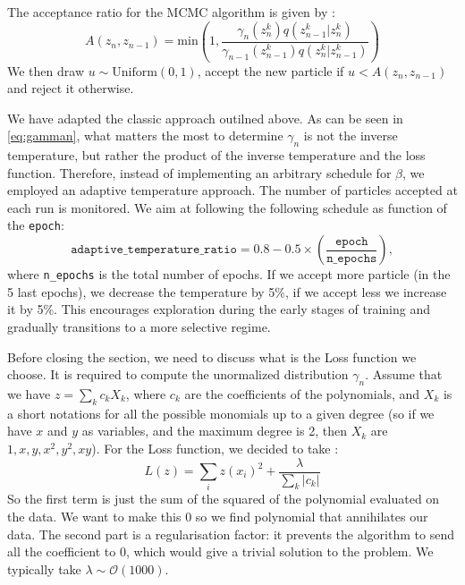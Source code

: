 \documentclass[11pt,a4paper]{article}
\newcommand{\bd}[1]{\marginpar{\parbox{\marginparwidth}{\boldmath $\Longleftarrow$}}{\boldmath\bfseries (bd: #1)}}
\begin{document}
		
		The acceptance ratio for the MCMC algorithm is given by : 
		\begin{equation}\label{eq:acceptanceratio}
			A(z_n,z_{n-1}) = \mathrm{min} \left(1,\frac{ \gamma_n(z_n^k) q(z_{n-1}^k | z_n^k) }{ \gamma_{n-1}(z_{n-1}^k) q(z_n^k | z_{n-1}^k) }  \right)
		\end{equation}
		We then draw $u\sim \mathrm{Uniform}(0,1)$, accept the new particle if $u<A(z_n,z_{n-1})$ and reject it otherwise.

		We have adapted the classic approach outilned above. As can be seen in \eqref{eq:gamman}, what matters the most to determine $\gamma_{n}$ is not the inverse temperature, but rather the product of the inverse temperature and the loss function. Therefore, instead of implementing an arbitrary schedule for $\beta$, we employed an adaptive temperature approach. The number of particles accepted at each run is monitored. We aim at following the following schedule as function of the \texttt{epoch}:
		\begin{equation} \label{eq:eqadaptivetemperatureschedule}
			\texttt{adaptive\_temperature\_ratio} = 0.8 - 0.5 \times \left(\frac{\texttt{epoch}}{\texttt{n\_epochs}}\right),
		\end{equation}
		where \texttt{n\_epochs} is the total number of epochs. If we accept more particle (in the 5 last epochs), we decrease the temperature by 5\%, if we accept less we increase it by 5\%. This encourages exploration during the early stages of training and gradually transitions to a more selective regime. \bd{Move \ref{eq:eqadaptivetemperatureschedule} in seciton 4?}
		
		Before closing the section, we need to discuss what is the Loss function we choose. It is required to compute the unormalized distribution $\gamma_n$. Assume that we have $z = \sum_k c_k X_k$, where $c_k$ are the coefficients of the polynomials, and $X_k$ is a short notations for all the possible monomials up to a given degree (so if we have $x$ and $y$ as variables, and the maximum degree is 2, then $X_k$ are $1, x, y, x^2, y^2, x y$). For the Loss function, we decided to take : 
		\begin{equation} \label{eq:lossreg}
			L(z) = \sum_{i} z(x_i)^2 + \frac{\lambda}{\sum_k |c_k|}
		\end{equation}
		So the first term is just the sum of the squared of the polynomial evaluated on the data. We want to make this 0 so we find polynomial that annihilates our data. The second part is a regularisation factor: it prevents the algorithm to send all the coefficient to 0, which would give a trivial solution to the problem. We typically take $\lambda \sim \mathcal{O}(1000)$.
		
\end{document}

